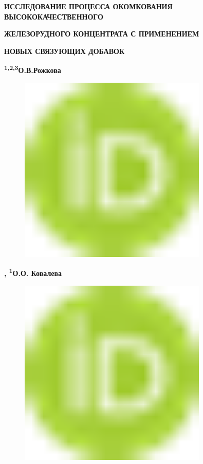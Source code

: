 
{\bfseries ИССЛЕДОВАНИЕ ПРОЦЕССА ОКОМКОВАНИЯ ВЫСОКОКАЧЕСТВЕННОГО}

{\bfseries ЖЕЛЕЗОРУДНОГО КОНЦЕНТРАТА С ПРИМЕНЕНИЕМ}

{\bfseries НОВЫХ СВЯЗУЮЩИХ ДОБАВОК}

{\bfseries \textsuperscript{1,2,3}О.В.Рожкова}
\begin{figure}[H]
	\centering
	\includegraphics[width=0.8\textwidth]{media/chem2/image1}
	\caption*{}
\end{figure}
{\bfseries \textsuperscript{\envelope },
\textsuperscript{1}О.О.
Ковалева}
\begin{figure}[H]
	\centering
	\includegraphics[width=0.8\textwidth]{media/chem2/image1}
	\caption*{}
\end{figure}
